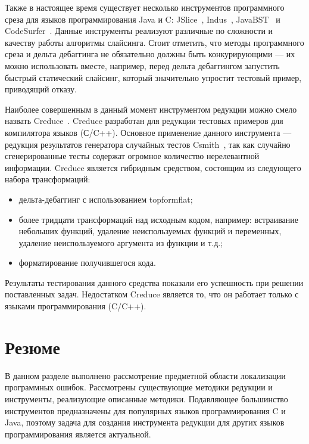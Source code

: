Также в настоящее время существует несколько инструментов программного среза для языков программирования Java и C: JSlice~\cite{WR:04}, Indus~\cite{jayaraman2005kaveri}, JavaBST~\cite{abdallah2017javabst} и CodeSurfer~\cite{anderson2004codesurfer}. Данные инструменты реализуют различные по сложности и качеству работы алгоритмы слайсинга. Стоит отметить, что методы программного среза и дельта дебаггинга не обязательно должны быть конкурирующими --- их можно использовать вместе, например, перед дельта дебаггингом запустить быстрый статический слайсинг, который значительно упростит тестовый пример, приводящий отказу.


Наиболее совершенным в данный момент инструментом редукции можно смело назвать Creduce~\cite{regehr2012test}. Creduce разработан для редукции тестовых примеров для компилятора языков (С/C++). Основное применение данного инструмента --- редукция результатов генератора случайных тестов Csmith~\cite{yang2011finding}, так как случайно сгенерированные тесты содержат огромное количество нерелевантной информации. Creduce является гибридным средством, состоящим из следующего набора трансформаций:
\begin{itemize}
	\item дельта-дебаггинг с использованием topformflat;
	\item более тридцати трансформаций над исходным кодом, например: встраивание небольших функций, удаление неиспользуемых функций и переменных, удаление неиспользуемого аргумента из функции и т.д.;
	\item форматирование получившегося кода.
\end{itemize}
Результаты тестирования данного средства показали его успешность при решении поставленных задач. Недостатком Creduce является то, что он работает только с языками программирования (C/C++).

\section{Резюме}
В данном разделе выполнено рассмотрение предметной области локализации программных ошибок. Рассмотрены существу­ющие методики редукции и инструменты, реализующие описанные методики. Подавляющее большинство инструментов предназначены для популярных языков программирования C и Java, поэтому задача для создания инструмента редукции для других языков программирования является актуальной.